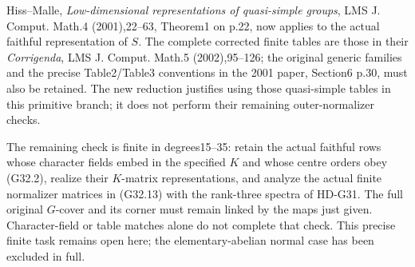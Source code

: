 Hiss--Malle, \emph{Low-dimensional representations of quasi-simple
groups}, LMS J. Comput. Math.4 (2001),22--63, Theorem1 on p.22,
now applies to the actual faithful representation of \(S\).
The complete corrected finite tables are those in their
\emph{Corrigenda}, LMS J. Comput. Math.5 (2002),95--126;
the original generic families and the precise Table2/Table3
conventions in the 2001 paper, Section6 p.30, must also be retained.
The new reduction justifies using those quasi-simple tables in
this primitive branch; it does not perform their remaining
outer-normalizer checks.

The remaining check is finite in degrees15--35: retain the actual
faithful rows whose character fields embed in the specified \(K\)
and whose centre orders obey (G32.2), realize their \(K\)-matrix
representations, and analyze the actual finite normalizer matrices
in (G32.13) with the rank-three spectra of HD-G31. The full
original \(G\)-cover and its corner must remain linked by the
maps just given. Character-field or table matches alone do not
complete that check. This precise finite task remains open here;
the elementary-abelian normal case has been excluded in full.
